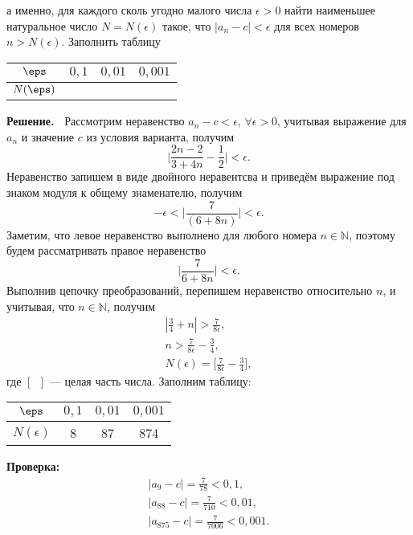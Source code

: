 \documentclass{article}
\begin{document}
\begin{flushleft}
а именно, для каждого сколь угодно малого числа ${\epsilon}>0$ найти наименьшее натуральное число 
$N=N({\epsilon})$ такое, что $|a_n-c|<{\epsilon}$ для всех номеров $n>N({\epsilon})$.
Заполнить таблицу
\begin{center}
	\begin{tabular}{|c|c|c|c|}
		\hline
		$\eps$ &  $0{,}1$ & $0{,}01$ & $0{,}001$ \\
		\hline
		$N(\eps)$ & & & \\
		\hline
	\end{tabular}
\end{center}
{\bf Решение.~}	
Рассмотрим неравенство $a_n-c<{\epsilon},\,\forall{\epsilon}>0$, учитывая выражение для $a_n$ и значение $c$ из условия варианта,
получим
$$
\biggl|\frac{2n-2}{3+4n}-\frac12\biggr| < {\epsilon}.
$$
Неравенство запишем в виде двойного неравентсва и приведём выражение под знаком модуля к общему знаменателю,
получим
$$
-{\epsilon} < \biggl|\frac{7}{(6+8n)}\biggl| < {\epsilon}.
$$
Заметим, что левое неравенство выполнено для любого номера $n\in\mathbb{N}$, поэтому будем рассматривать правое неравенство 
$$
\biggl|\frac{7}{6+8n}\biggl| < {\epsilon}.
$$
Выполнив цепочку преобразований, перепишем неравенство относительно $n$, и учитывая, что $n\in\mathbb{N}$, получим
$$
\begin{array}{c}
|\frac{3}{4}+n| > \frac{7}{8{\epsilon}}, 							\\[20pt]
n > \frac{7}{8{\epsilon}}-\frac34, 		\\[20pt]
N({\epsilon}) = \biggl[\frac{7}{8{\epsilon}}-\frac34\biggl],
\end{array}
$$
где $[\phantom{a}]$ --- целая часть числа.
Заполним таблицу:
\begin{center}
	\begin{tabular}{|c|c|c|c|}
		\hline
		$\eps$ &  $0{,}1$ & $0{,}01$ & $0{,}001$ \\
		\hline
		$N({\epsilon})$ & 8 & 87 & 874 \\
		\hline
	\end{tabular}
\end{center}
\textbf{Проверка:}
$$
\begin{array}{l}
|a_9 - c| = \frac{7}{78} < 0{,}1,			\\[10pt]
|a_{88} - c| = \frac{7}{710} < 0{,}01,	\\[10pt]
|a_{875} - c| = \frac{7}{7006} < 0{,}001.
\end{array}
$$


\end{flushleft}
\end{document}
